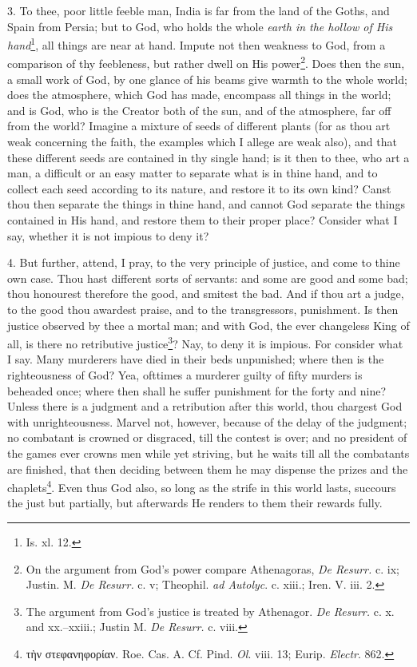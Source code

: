 3. To thee, poor little feeble man, India is far from the land of the Goths, and Spain from Persia; but to God, who holds the whole \emph{earth in the hollow of His hand}\footnote{Is. xl. 12.}, all things are near at hand. Impute not then weakness to God, from a comparison of thy feebleness, but rather dwell on His power\footnote{On the argument from God’s power compare Athenagoras, \emph{De Resurr.} c. ix; Justin. M. \emph{De Resurr.} c. v; Theophil. \emph{ad Autolyc}. c. xiii.; Iren. V. iii. 2.}. Does then the sun, a small work of God, by one glance of his beams give warmth to the whole world; does the atmosphere, which God has made, encompass all things in the world; and is God, who is the Creator both of the sun, and of the atmosphere, far off from the world? Imagine a mixture of seeds of different plants (for as thou art weak concerning the faith, the examples which I allege are weak also), and that these different seeds are contained in thy single hand; is it then to thee, who art a man, a difficult or an easy matter to separate what is in thine hand, and to collect each seed according to its nature, and restore it to its own kind? Canst thou then separate the things in thine hand, and cannot God separate the things contained in His hand, and restore them to their proper place? Consider what I say, whether it is not impious to deny it?

4. But further, attend, I pray, to the very principle of justice, and come to thine own case. Thou hast different sorts of servants: and some are good and some bad; thou honourest therefore the good, and smitest the bad. And if thou art a judge, to the good thou awardest praise, and to the transgressors, punishment. Is then justice observed by thee a mortal man; and with God, the ever changeless King of all, is there no retributive justice\footnote{The argument from God’s justice is treated by Athenagor. \emph{De Resurr.} c. x. and xx.–xxiii.; Justin M. \emph{De Resurr.} c. viii.}? Nay, to deny it is impious. For consider what I say. Many murderers have died in their beds unpunished; where then is the righteousness of God? Yea, ofttimes a murderer guilty of fifty murders is beheaded once; where then shall he suffer punishment for the forty and nine? Unless there is a judgment and a retribution after this world, thou chargest God with unrighteousness. Marvel not, however, because of the delay of the judgment; no combatant is crowned or disgraced, till the contest is over; and no president of the games ever crowns men while yet striving, but he waits till all the combatants are finished, that then deciding between them he may dispense the prizes and the chaplets\footnote{\textgreek{τὴν στεφανηφορίαν}. Roe. Cas. A. Cf. Pind. \emph{Ol}. viii. 13; Eurip. \emph{Electr}. 862.}. Even thus God also, so long as the strife in this world lasts, succours the just but partially, but afterwards He renders to them their rewards fully.

